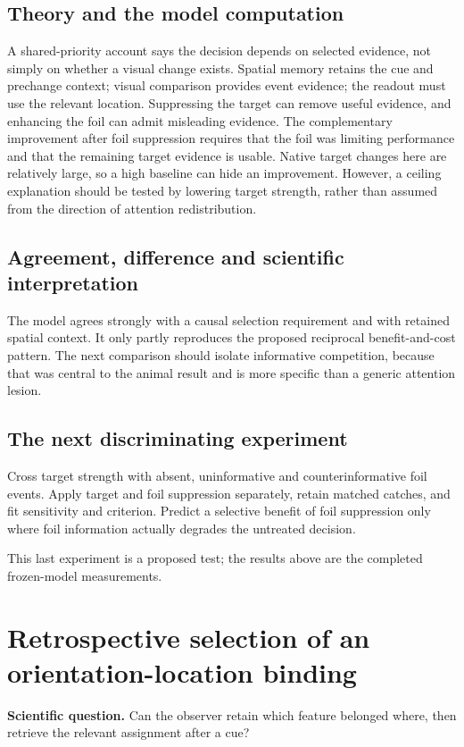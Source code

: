 \documentclass[11pt]{article}
\begin{document}
\subsection{Theory and the model computation}
A shared-priority account says the decision depends on selected evidence, not simply on whether a visual change exists. Spatial memory retains the cue and prechange context; visual comparison provides event evidence; the readout must use the relevant location. Suppressing the target can remove useful evidence, and enhancing the foil can admit misleading evidence. The complementary improvement after foil suppression requires that the foil was limiting performance and that the remaining target evidence is usable. Native target changes here are relatively large, so a high baseline can hide an improvement. However, a ceiling explanation should be tested by lowering target strength, rather than assumed from the direction of attention redistribution.

\subsection{Agreement, difference and scientific interpretation}
The model agrees strongly with a causal selection requirement and with retained spatial context. It only partly reproduces the proposed reciprocal benefit-and-cost pattern. The next comparison should isolate informative competition, because that was central to the animal result and is more specific than a generic attention lesion.

\subsection{The next discriminating experiment}
Cross target strength with absent, uninformative and counterinformative foil events. Apply target and foil suppression separately, retain matched catches, and fit sensitivity and criterion. Predict a selective benefit of foil suppression only where foil information actually degrades the untreated decision.

This last experiment is a proposed test; the results above are the completed frozen-model measurements.
\clearpage\section{Retrospective selection of an orientation-location binding}
\textbf{Scientific question.} Can the observer retain which feature belonged where, then retrieve the relevant assignment after a cue?
\end{document}
